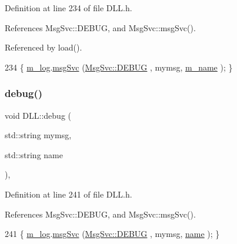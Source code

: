 Definition at line 234 of file D\+L\+L.\+h.



References Msg\+Svc\+::\+D\+E\+B\+UG, and Msg\+Svc\+::msg\+Svc().



Referenced by load().


\begin{DoxyCode}
234 \{ \hyperlink{classDLL_a6e66cd993e2d142b48691557ce8e4047}{m\_log}.\hyperlink{classMsgSvc_ad25f18047920cc59a314e5098259711c}{msgSvc} (\hyperlink{classMsgSvc_ae671eb7301996cd049d2da8a65925926a1dbdcc82dce88370ec335883c83b38b0}{MsgSvc::DEBUG}   , mymsg, \hyperlink{classDLL_ad5e4d36d8c2575447f73acc2a703b405}{m\_name} ); \}
\end{DoxyCode}
\mbox{\label{classDLL_a681470b03d31aab77229bb2e3a72409c}} 
\subsubsection{\texorpdfstring{debug()}{debug()}\hspace{0.1cm}{\footnotesize\ttfamily [2/2]}}
{\footnotesize\ttfamily void D\+L\+L\+::debug (\begin{DoxyParamCaption}\item[{std\+::string}]{mymsg,  }\item[{std\+::string}]{name }\end{DoxyParamCaption})\hspace{0.3cm}{\ttfamily [inline]}, {\ttfamily [private]}}



Definition at line 241 of file D\+L\+L.\+h.



References Msg\+Svc\+::\+D\+E\+B\+UG, and Msg\+Svc\+::msg\+Svc().


\begin{DoxyCode}
241 \{ \hyperlink{classDLL_a6e66cd993e2d142b48691557ce8e4047}{m\_log}.\hyperlink{classMsgSvc_ad25f18047920cc59a314e5098259711c}{msgSvc} (\hyperlink{classMsgSvc_ae671eb7301996cd049d2da8a65925926a1dbdcc82dce88370ec335883c83b38b0}{MsgSvc::DEBUG}   , mymsg, \hyperlink{classDLL_a0a915d538771dde2cb0580cd340ee088}{name} ); \}
\end{DoxyCode}
\mbox{\label{classDLL_abbe40e8f9065dfcfef3df9decb60087b}} 
